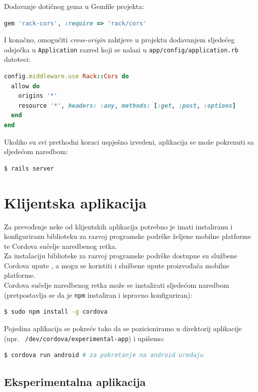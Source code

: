 Dodavanje dotičnog gema u Gemfile projekta:
\begin{lstlisting}[language=ruby]
gem 'rack-cors', :require => 'rack/cors'
\end{lstlisting}

I konačno, omogućiti \textit{cross-origin} zahtjeve u projektu dodavanjem sljedećeg odsječka u \texttt{Application} razred koji se nalazi u \texttt{app/config/application.rb} datoteci:
\begin{lstlisting}[language=ruby]
config.middleware.use Rack::Cors do
  allow do
    origins '*'
    resource '*', headers: :any, methods: [:get, :post, :options]
  end
end
\end{lstlisting}

Ukoliko su svi prethodni koraci uspješno izvedeni, aplikacija se može pokrenuti sa sljedećom naredbom:
\begin{lstlisting}[language=bash]
$ rails server
\end{lstlisting}


\section{Klijentska aplikacija}

Za prevođenje neke od klijentskih aplikacija potrebno je imati instaliranu i konfiguriranu biblioteku za razvoj programske podrške željene mobilne platforme te Cordova sučelje naredbenog retka.
\\
Za instalaciju biblioteke za razvoj programske podrške dostupne su službene Cordova upute \citep{cordovaGuide}, a mogu se koristiti i službene upute proizvođača mobilne platforme.
\\
Cordova sučelje naredbenog retka može se instalirati sljedećom naredbom (pretpostavlja se da je \texttt{npm} instaliran i ispravno konfiguriran):
\begin{lstlisting}[language=bash]
$ sudo npm install -g cordova
\end{lstlisting}

Pojedina aplikacija se pokreće tako da se pozicioniramo u direktorij aplikacije (npr. \texttt{~/dev/cordova/experimental-app}) i  upišemo:
\begin{lstlisting}[language=bash]
$ cordova run android # za pokretanje na android uredaju
\end{lstlisting}

\subsection{Eksperimentalna aplikacija}

